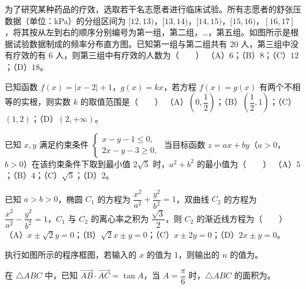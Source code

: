 \begin{question}
为了研究某种药品的疗效，选取若干名志愿者进行临床试验。所有志愿者的舒张压数据（单位：kPa）的分组区间为 $[12,13)$，$[13,14)$，$[14,15)$，$[15,16)$，$[16,17]$，将其按从左到右的顺序分别编号为第一组，第二组，…，第五组。如图所示是根据试验数据制成的频率分布直方图。已知第一组与第二组共有 $20$ 人，第三组中没有疗效的有 $6$ 人，则第三组中有疗效的人数为\mbox{（　　）}
（A）$6$；（B）$8$；（C）$12$；（D）$18$。
\nopagebreak[4]
\begin{center}\end{center}
\nopagebreak[4]
\end{question}
\begin{question}
已知函数 $f(x)=|x-2|+1$，$g(x)=kx$，若方程 $f(x)=g(x)$ 有两个不相等的实根，则实数 $k$ 的取值范围是\mbox{（　　）}
（A）$\left(0,\dfrac12\right)$；（B）$\left(\dfrac12,1\right)$；（C）$(1,2)$；（D）$(2,+\infty)$。
\end{question}
\begin{question}
已知 $x,y$ 满足约束条件 $\begin{cases}x-y-1\leqslant0,\\2x-y-3\geqslant0,\end{cases}$ 当目标函数 $z=ax+by$（$a>0$，$b>0$）在该约束条件下取到最小值 $2\sqrt5$ 时，$a^2+b^2$ 的最小值为\mbox{（　　）}
（A）$5$；（B）$4$；（C）$\sqrt5$；（D）$2$。
\end{question}
\begin{question}
已知 $a>b>0$，椭圆 $C_1$ 的方程为 $\dfrac{x^2}{a^2}+\dfrac{y^2}{b^2}=1$，双曲线 $C_2$ 的方程为 $\dfrac{x^2}{a^2}-\dfrac{y^2}{b^2}=1$，$C_1$ 与 $C_2$ 的离心率之积为 $\dfrac{\sqrt3}2$，则 $C_2$ 的渐近线方程为\mbox{（　　）}
（A）$x\pm\sqrt2y=0$；（B）$\sqrt2x\pm y=0$；（C）$x\pm2y=0$；（D）$2x\pm y=0$。
\end{question}
\Needspace{0.4\textheight}
\begin{question}
执行如图所示的程序框图，若输入的 $x$ 的值为 $1$，则输出的 $n$ 的值为\gkblank{}。
\nopagebreak[4]
\begin{center}\end{center}
\nopagebreak[4]
\end{question}
\begin{question}
在 $\triangle ABC$ 中，已知 $\overrightarrow{AB}\cdot\overrightarrow{AC}=\tan A$，当 $A=\dfrac\pi6$ 时，$\triangle ABC$ 的面积为\gkblank{}。
\end{question}
